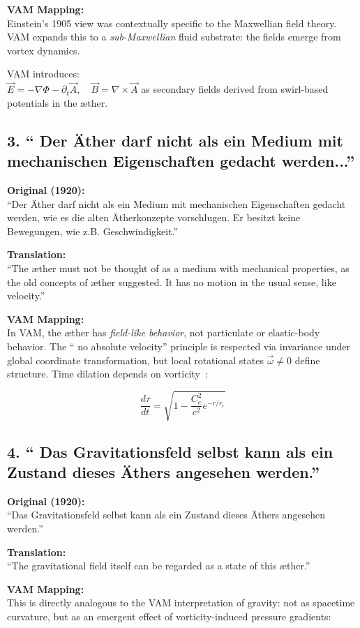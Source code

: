 \textbf{VAM Mapping:} \\
Einstein's 1905 view was contextually specific to the Maxwellian field theory. VAM expands this to a \emph{sub-Maxwellian} fluid substrate: the fields emerge from vortex dynamics.

VAM introduces: \\
\( \vec{E} = -\nabla \Phi - \partial_t \vec{A}, \quad \vec{B} = \nabla \times \vec{A} \) as secondary fields derived from swirl-based potentials in the æther.

\subsection*{3. `` Der Äther darf nicht als ein Medium mit mechanischen Eigenschaften gedacht werden...''}
\textbf{Original (1920):} \\
``Der Äther darf nicht als ein Medium mit mechanischen Eigenschaften gedacht werden, wie es die alten Ätherkonzepte vorschlugen. Er besitzt keine Bewegungen, wie z.B. Geschwindigkeit.''

\textbf{Translation:} \\
``The æther must not be thought of as a medium with mechanical properties, as the old concepts of æther suggested. It has no motion in the usual sense, like velocity.''

\textbf{VAM Mapping:} \\
In VAM, the æther has \emph{field-like behavior}, not particulate or elastic-body behavior. The `` no absolute velocity'' principle is respected via invariance under global coordinate transformation, but local rotational states \( \vec{\omega} \neq 0 \) define structure. Time dilation depends on vorticity~\cite{VAM-2}:

\[
\frac{d\tau}{dt} = \sqrt{1 - \frac{C_e^2}{c^2} e^{-r/r_c}}
\]

\subsection*{4. `` Das Gravitationsfeld selbst kann als ein Zustand dieses Äthers angesehen werden.''}
\textbf{Original (1920):} \\
``Das Gravitationsfeld selbst kann als ein Zustand dieses Äthers angesehen werden.''

\textbf{Translation:} \\
``The gravitational field itself can be regarded as a state of this æther.''

\textbf{VAM Mapping:} \\
This is directly analogous to the VAM interpretation of gravity: not as spacetime curvature, but as an emergent effect of vorticity-induced pressure gradients:

